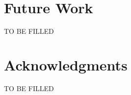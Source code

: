 \documentclass{sig-alternative}
\begin{document}
\section{Future Work}

TO BE FILLED
 
 

\section*{Acknowledgments}
TO BE FILLED
 
\vspace*{0.5mm}
 
 


\balance
  

   



  


  
\end{document}
